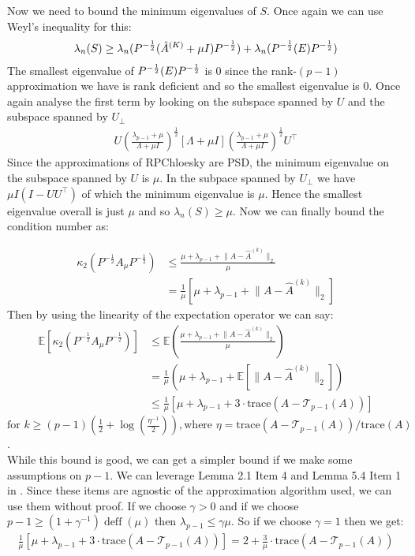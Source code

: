 Now we need to bound the minimum eigenvalues of $S$. Once again we can use Weyl's inequality for this:
\begin{align*}
    \lambda_n(S) \geq \lambda_n(P^{-\frac{1}{2}} (\hat{A}^{(K)} + \mu I) P^{-\frac{1}{2}}) + \lambda_n(P^{-\frac{1}{2}} (E) P^{-\frac{1}{2}})
\end{align*}
The smallest eigenvalue of $P^{-\frac{1}{2}} (E) P^{-\frac{1}{2}}$ is 0 since the rank-$(p-1)$ approximation we have is rank deficient and so
the smallest eigenvalue is 0. Once again analyse the first term by looking on the subspace spanned by $U$ and the
subspace spanned by $U_{\perp}$ 
\begin{align*}
    U(\frac{\lambda_{p-1} + \mu}{\Lambda + \mu I})^{\frac{1}{2}}[\Lambda + \mu I](\frac{\lambda_{p-1} + \mu}{\Lambda + \mu I})^{\frac{1}{2}}U^{\top}
\end{align*}
Since the approximations of RPChloesky are PSD, the minimum eigenvalue on the subspace spanned by $U$ is $\mu$. In the
subpace spanned by $U_{\perp}$ we have $\mu I(I-UU^{\top})$ of which the minimum eigenvalue is $\mu$. Hence the smallest
eigenvalue overall is just $\mu$ and so $\lambda_n(S) \geq \mu$. Now we can finally bound the condition number as:

\begin{align*}
    \kappa_2(P^{-\frac{1}{2}}A_{\mu}P^{-\frac{1}{2}}) & \leq \frac{\mu + \lambda_{p-1} + \lVert A - \hat{A}^{(k)}\rVert_2}{\mu} \\
                                                      &= \frac{1}{\mu}\left[\mu + \lambda_{p-1} + \lVert A - \hat{A}^{(k)}\rVert_2 \right]
\end{align*}
Then by using the linearity of the expectation operator we can say:
\begin{align*}
    \mathds{E}\left[\kappa_2(P^{-\frac{1}{2}}A_{\mu}P^{-\frac{1}{2}})\right] & \leq \mathds{E}\left(\frac{\mu + \lambda_{p-1} + \lVert A - \hat{A}^{(k)}\rVert_2}{\mu}\right) \\
                                                      &= \frac{1}{\mu}\left(\mu + \lambda_{p-1} + \mathds{E}\left[\lVert A - \hat{A}^{(k)}\rVert_2\right] \right) \\
                                                      &\leq \frac{1}{\mu}\left[\mu + \lambda_{p-1} + 3\cdot\text{trace}(A - \mathcal{T}_{p-1}(A))\right]
\end{align*}
$\text{for } k \geq (p-1)(\frac{1}{2} + \log{(\frac{\eta^{-1}}{2})}), \text{where } \eta = \text{trace}(A -
\mathcal{T}_{p-1}(A)) / \text{trace}(A)$. \\
While this bound is good, we can get a simpler bound if we make some assumptions on $p-1$. We can leverage Lemma 2.1
Item 4 and Lemma 5.4 Item 1 in \cite{frangella2021randomizednystrompreconditioning}. Since these items are agnostic of
the approximation algorithm used, we can use them without proof. If we choose $\gamma > 0$ and if we choose $p-1 \geq
(1 + \gamma^{-1})\operatorname{deff}(\mu)$ then $\lambda_{p-1} \leq \gamma\mu$. So if we choose $\gamma = 1$ then we
get:
\begin{align*}
    \frac{1}{\mu}\left[\mu + \lambda_{p-1} + 3\cdot\text{trace}(A - \mathcal{T}_{p-1}(A))\right] = 2 + \frac{3}{\mu}\cdot\text{trace}(A - \mathcal{T}_{p-1}(A))
\end{align*}



